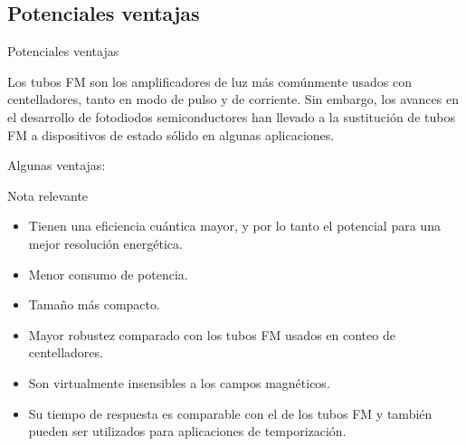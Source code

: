 \documentclass[a4paper,10pt]{beamer}
\begin{document}
\subsection{Potenciales ventajas}
\begin{frame}{Potenciales ventajas}
 
 \begin{justify}
  Los tubos FM son los amplificadores de luz más comúnmente usados con centelladores,
  tanto en modo de pulso y de corriente. Sin embargo, los avances en el desarrollo de 
  fotodiodos semiconductores han llevado a la sustitución de tubos FM a dispositivos de 
  estado sólido en algunas aplicaciones.
 \end{justify}
 
 {\large{\color{blue}Algunas ventajas}:}
 
 \begin{block}{Nota relevante}
  \begin{itemize}[<+->]
   \item \begin{justify}
          Tienen una eficiencia cuántica mayor, y por lo tanto el potencial para 
          una mejor resolución energética.
         \end{justify}
  \item  \begin{justify}
          Menor consumo de potencia.
         \end{justify}
  \item  \begin{justify}
          Tamaño más compacto.
         \end{justify}
  \item  \begin{justify}
	  Mayor robustez comparado con los tubos FM usados en conteo de centelladores.
         \end{justify}
  \item  \begin{justify}
	  Son virtualmente insensibles a los campos magnéticos.
         \end{justify}
  \item  \begin{justify}
	  Su tiempo de respuesta es comparable con el de los tubos FM y también 
	  pueden ser utilizados para aplicaciones de temporización.
         \end{justify}
 
  \end{itemize}
 \end{block}
 
\end{frame}
\end{document}
